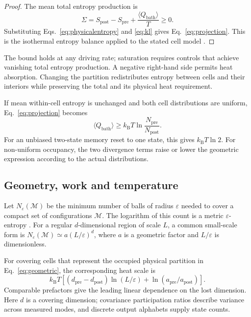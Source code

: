 \documentclass[10pt,a4paper,twocolumn]{article}
\newcommand{\kB}{k_{\mathrm B}}
\numberwithin{equation}{section}
\begin{document}
\begin{proof}
The mean total entropy production is
\begin{equation}
\Sigma=S_{\mathrm{post}}-S_{\mathrm{pre}}
+\frac{\langle Q_{\mathrm{bath}}\rangle}{T}\geq0 .
\label{eq:secondlaw}
\end{equation}
Substituting Eqs.~\eqref{eq:physicalentropy} and \eqref{eq:kl} gives Eq.~\eqref{eq:projection}. This is the isothermal entropy balance applied to the stated cell model \cite{seifert2012}.
\end{proof}

The bound holds at any driving rate; saturation requires controls that achieve vanishing total entropy production. A negative right-hand side permits heat absorption. Changing the partition redistributes entropy between cells and their interiors while preserving the total and its physical heat requirement.

If mean within-cell entropy is unchanged and both cell distributions are uniform, Eq.~\eqref{eq:projection} becomes
\begin{equation}
\langle Q_{\mathrm{bath}}\rangle
\geq \kB T\ln\frac{N_{\mathrm{pre}}}{N_{\mathrm{post}}}.
\label{eq:geometric}
\end{equation}
For an unbiased two-state memory reset to one state, this gives $\kB T\ln2$. For non-uniform occupancy, the two divergence terms raise or lower the geometric expression according to the actual distributions.

\subsection{Geometry, work and temperature}

Let $N_\varepsilon(\mathcal M)$ be the minimum number of balls of radius $\varepsilon$ needed to cover a compact set of configurations $\mathcal M$. The logarithm of this count is a metric $\varepsilon$-entropy \cite{kolmogorov1959}. For a regular $d$-dimensional region of scale $L$, a common small-scale form is $N_\varepsilon(\mathcal M)\simeq a(L/\varepsilon)^d$, where $a$ is a geometric factor and $L/\varepsilon$ is dimensionless.

For covering cells that represent the occupied physical partition in Eq.~\eqref{eq:geometric}, the corresponding heat scale is
\begin{equation}
\kB T\left[(d_{\mathrm{pre}}-d_{\mathrm{post}})
\ln(L/\varepsilon)+\ln(a_{\mathrm{pre}}/a_{\mathrm{post}})\right].
\label{eq:dimension}
\end{equation}
Comparable prefactors give the leading linear dependence on the lost dimension. Here $d$ is a covering dimension; covariance participation ratios describe variance across measured modes, and discrete output alphabets supply state counts.
\end{document}
